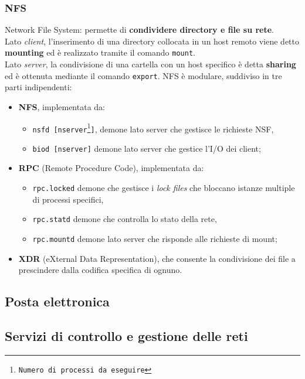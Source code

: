 \documentclass[a4paper,11pt]{article}
\def\code#1{\texttt{#1}}
\def\italic#1{\textit{#1}}
\begin{document}
\subsubsection{NFS}
Network File System: permette di \textbf{condividere directory e file su rete}.\\Lato \textit{client}, l'inserimento di una directory collocata in un host remoto viene detto \textbf{mounting} ed è realizzato tramite il comando \code{mount}.\\
Lato \textit{server}, la condivisione di una cartella con un host specifico è detta \textbf{sharing} ed è ottenuta mediante il comando \code{export}.
NFS è modulare, suddiviso in tre parti indipendenti:
\begin{itemize}
\item \textbf{NFS}, implementata da: 
\begin{itemize}
\item \code{nsfd [nserver\footnote{Numero di processi da eseguire}]}, demone lato server  che gestisce le richieste NSF,
\item \code{biod [nserver]} demone lato server che gestice l'I/O dei client;
\end{itemize}
\item \textbf{RPC} (Remote Procedure Code), implementata da:
\begin{itemize}
\item \code{rpc.locked} demone che gestisce i \italic{lock files} che bloccano istanze multiple di processi specifici,
\item \code{rpc.statd} demone che controlla lo stato della rete,
\item \code{rpc.mountd} demone lato server che risponde alle richieste di mount;
\end{itemize}
\item \textbf{XDR} (eXternal Data Representation), che consente la condivisione dei file a prescindere dalla codifica specifica di ognuno.
\end{itemize} 
\subsection{Posta elettronica}
\subsection{Servizi di controllo e gestione delle reti}
\end{document}
